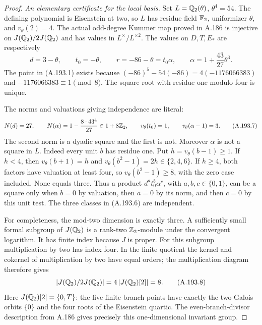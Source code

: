 \begin{proof}
\emph{An elementary certificate for the local basis.}
Set \(L=\mathbb Q_2(\theta)\), \(\theta^4=54\).
The defining polynomial is Eisenstein at two, so
\(L\) has residue field \(\mathbb F_2\), uniformizer \(\theta\),
and \(v_\theta(2)=4\).  The actual odd-degree Kummer map
proved in A.186 is injective on \(J(\mathbb Q_2)/2J(\mathbb Q_2)\)
and has values in \(L^\times/L^{\times2}\).
The values on \(D,T,E_*\) are respectively
\[
 d=3-\theta,\qquad t_0=-\theta,\qquad
 r=-86-\theta=t_0\alpha,
 \qquad\alpha=1+\frac{43}{27}\theta^3.
\tag{A.193.6}
\]
The point in (A.193.1) exists because
\((-86)^5-54(-86)=4(-1176066383)\) and
\(-1176066383\equiv1\pmod8\).
The square root with residue one modulo four is unique.

The norms and valuations giving independence are literal:
\[
 N(d)=27,\qquad
 N(\alpha)=1-\frac{8\cdot43^4}{27}\in1+8\mathbb Z_2,
 \qquad v_\theta(t_0)=1,\qquad
 v_\theta(\alpha-1)=3.
\tag{A.193.7}
\]
The second norm is a dyadic square and the first is not.
Moreover \(\alpha\) is not a square in \(L\).
Indeed every unit \(b\) has residue one.  Put
\(h=v_\theta(b-1)\geq1\).  If \(h<4\),
then \(v_\theta(b+1)=h\) and
\(v_\theta(b^2-1)=2h\in\{2,4,6\}\).
If \(h\geq4\), both factors have valuation at least four,
so \(v_\theta(b^2-1)\geq8\), with the zero case included.
None equals three.  Thus a product
\(d^a t_0^b\alpha^c\), with \(a,b,c\in\{0,1\}\),
can be a square only when \(b=0\) by valuation,
then \(a=0\) by its norm, and then \(c=0\) by this unit test.
The three classes in (A.193.6) are independent.

For completeness, the mod-two dimension is exactly three.
A sufficiently small formal subgroup of \(J(\mathbb Q_2)\)
is a rank-two \(\mathbb Z_2\)-module under the convergent logarithm.
It has finite index because \(J\) is proper.
For this subgroup multiplication by two has index four.
In the finite quotient the kernel and cokernel of multiplication
by two have equal orders; the multiplication diagram therefore
gives
\[
       |J(\mathbb Q_2)/2J(\mathbb Q_2)|=4\,|J(\mathbb Q_2)[2]|=8.
\tag{A.193.8}
\]
Here \(J(\mathbb Q_2)[2]=\{0,T\}\): the five finite branch points
have exactly the two Galois orbits \(\{0\}\) and the four roots
of the Eisenstein quartic.  The even-branch-divisor description
from A.186 gives precisely this one-dimensional invariant group.


\end{proof}
